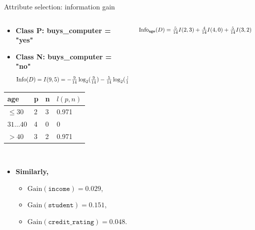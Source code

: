 \documentclass[aspectratio=169,t,table]{beamer}
\begin{document}
  {
    \begin{frame}{Attribute selection: information gain}
      \begin{columns}
        \begin{column}{0.45\textwidth}
          \begin{itemize}
            \item \textbf{Class P: buys\_computer = "yes"}
            \item \textbf{Class N: buys\_computer = "no"}
            \begin{align*}
              \resizebox{7cm}{!}{%
                $\text{Info}(D) = I(9,5) = - \frac{9}{14}\log_2(\frac{9}{14})-\frac{5}{14} \log_2(\frac{5}{14}) = 0.94$
              }
            \end{align*}
          \end{itemize}
          \centering
          \begin{tabular}{|l|l|l|l|}
            \hline
            \cellcolor{blue!20}age & \cellcolor{blue!20}p & \cellcolor{blue!20}n & \cellcolor{blue!20}$l(p,n)$ \\\hline
            \cellcolor{yellow!20}$\leq 30$ & 2 & 3 & 0.971 \\\hline
            \cellcolor{yellow!20}$31\ldots40$ & 4 & 0 & 0 \\\hline
            \cellcolor{yellow!20}$>40$ & 3 & 2 & 0.971 \\\hline
          \end{tabular}\\[0.2cm]
        \begin{itemize}
          \item \textbf{Similarly,}
          \begin{itemize}
            \item $\text{Gain}(\texttt{income}) = 0.029$,
            \item $\text{Gain}(\texttt{student}) = 0.151$,
            \item $\text{Gain}(\texttt{credit\_rating}) = 0.048$.
          \end{itemize}
        \end{itemize}
        \end{column}
        \begin{column}{0.45\textwidth}
          \vspace{-1.3cm}
          \begin{align*}
            \resizebox{7cm}{!}{%
              $\text{Info}_{\texttt{age}}(D) = \frac{5}{14}I(2,3) + \frac{4}{14} I(4,0) + \frac{5}{14} I(3,2) = 0.694$.
}
\end{align*}
\end{column}
\end{columns}
\end{frame}}
\end{document}
